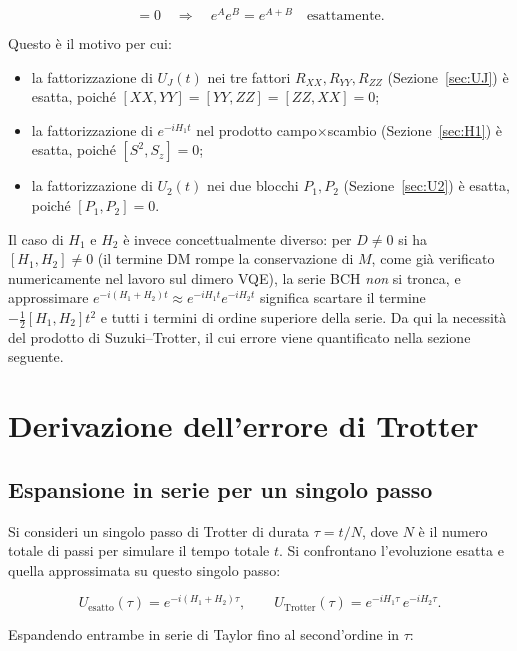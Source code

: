 \documentclass[11pt,a4paper]{article}
\begin{document}
\begin{equation}
[A,B]=0 \quad\Longrightarrow\quad e^{A}e^{B} = e^{A+B} \quad \text{esattamente}.
\end{equation}

Questo è il motivo per cui:
\begin{itemize}
\item la fattorizzazione di $U_J(t)$ nei tre fattori $R_{XX}, R_{YY}, R_{ZZ}$ (Sezione~\ref{sec:UJ}) è esatta, poiché $[XX,YY]=[YY,ZZ]=[ZZ,XX]=0$;
\item la fattorizzazione di $e^{-iH_1t}$ nel prodotto campo$\times$scambio (Sezione~\ref{sec:H1}) è esatta, poiché $[S^2,S_z]=0$;
\item la fattorizzazione di $U_2(t)$ nei due blocchi $P_1,P_2$ (Sezione~\ref{sec:U2}) è esatta, poiché $[P_1,P_2]=0$.
\end{itemize}

Il caso di $H_1$ e $H_2$ è invece concettualmente diverso: per $D\neq0$ si ha $[H_1,H_2]\neq0$ (il termine DM rompe la conservazione di $M$, come già verificato numericamente nel lavoro sul dimero VQE), la serie BCH \emph{non} si tronca, e approssimare $e^{-i(H_1+H_2)t}\approx e^{-iH_1t}e^{-iH_2t}$ significa scartare il termine $-\frac12[H_1,H_2]t^2$ e tutti i termini di ordine superiore della serie. Da qui la necessità del prodotto di Suzuki--Trotter, il cui errore viene quantificato nella sezione seguente.

\section{Derivazione dell'errore di Trotter}
\label{sec:trotter-error}

\subsection{Espansione in serie per un singolo passo}

Si consideri un singolo passo di Trotter di durata $\tau = t/N$, dove $N$ è il numero totale di passi per simulare il tempo totale $t$. Si confrontano l'evoluzione esatta e quella approssimata su questo singolo passo:

\begin{equation}
U_{\text{esatto}}(\tau) = e^{-i(H_1+H_2)\tau}, \qquad U_{\text{Trotter}}(\tau) = e^{-iH_1\tau}\,e^{-iH_2\tau}.
\end{equation}

Espandendo entrambe in serie di Taylor fino al second'ordine in $\tau$:
\end{document}
